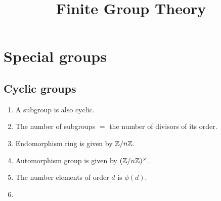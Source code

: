\documentclass{../exp}
\title{Finite Group Theory}
\begin{document}
\maketitle
\tableofcontents

\iffalse
presentation
	quotient of a free group
	homomorphism 잡기
		free group을 정의역으로 먼저 잡고 well-defined 보여서 quotient로 내리기
	element들을 두 제너레이터로 표현하기
isomorphism 보이기
	isomorphism theorem
	order argument
subgroup criterion: 항등원, 역원, 닫힘 순으로 증명
centralizer, center, normalizer
	각 그룹의 계산 -> 기본적으로 노가다, 마지막에 라그랑지 확인
	센트럴라이저의 대칭성
	N(H)/C(H) 정리, G/Z(G)=Inn(G)
stabilizer


----------
#
아벨군: 순환군, n-abelian 등 여러 조건, 기본정리
대칭군: 생성원, 트랜지티브, 교대군과 부호
콕세터: 이면군, 프레젠테이션
선형군: 

#
액션, 실로우: existence, congruence condition
부분군격자: 1. 특정위수 부분군의 존재성, 2. 각 부분군의 컨쥬게이트 개수
	노멀라이저의 크기를 잰다는 것 = 실로우군의 conjugate 개수 세는 것
	- 카운팅: 너무 많은 conjugate 배제하는 법
	- 인덱스: 푸앵카레 정리, least prime ind
	- 노말라이즈되는 부분군 잡아 노말라이저 띄우기
	케이스 나누기에 매우 좋은 조건을 제공
		노말 실로우 -> 바로 반직접곱
http://oeis.org/wiki/Number_of_groups_of_order_n

#
군 확장
컴포지션 시리즈의 이해
반직접: / 계산->아벨군의 자기동형군
중심적: 군코호몰로지 / 계산->보편계수정리

#
단순군: 단순군 아니기 테크닉, 단순군 보이기 테크닉, 교대군과 리타입 선형군

#
p군: 비자명센터, 개수 겁나많음
닐포턴트: 피팅, 프라티니
솔버블?
센트럴 시리즈?


\fi


\section{Special groups}

\subsection{Cyclic groups}
\begin{enumerate}
\item A subgroup is also cyclic.
\item The number of subgroups $=$ the number of divisors of its order.
\item Endomorphism ring is given by $\mathbb{Z}/n\mathbb{Z}$.
\item Automorphism group is given by $(\mathbb{Z}/n\mathbb{Z})^\times$.
\item The number elements of order $d$ is $\phi(d)$.
\item
\end{enumerate}
\end{document}
